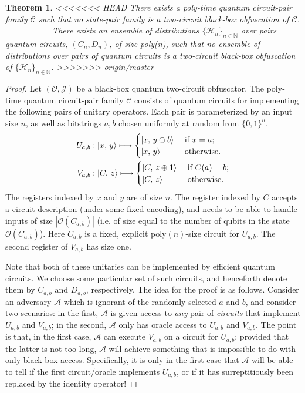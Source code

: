 \documentclass[11pt]{article}
\numberwithin{equation}{section}
\newtheorem{theorem}{Theorem}
\newcommand{\algo}{\mathcal}
\begin{document}
{\begin{theorem}
<<<<<<< HEAD
There exists a poly-time quantum circuit-pair family $\mathcal C$ such that no state-pair family is a two-circuit black-box obfuscation of $\mathcal C$.
=======
There exists an ensemble of distributions $\lbrace\mathcal{H}_n\rbrace_{n\in\mathbb{N}}$ over pairs quantum circuits, $(C_n, D_n)$, of size poly(n), such that no ensemble of distributions over pairs of quantum circuits is a two-circuit black-box obfuscation of $\lbrace\mathcal{H}_n\rbrace_{n\in\mathbb{N}}$.
>>>>>>> origin/master
\end{theorem}
\begin{proof}
Let $(\mathcal O, \mathcal J)$ be a black-box quantum two-circuit obfuscator. 
The poly-time quantum circuit-pair family $\mathcal C$ consists of quantum circuits for implementing the following pairs of unitary operators. Each pair is parameterized by an input size $n$, as well as bitstrings $a, b$ chosen uniformly at random from $\{0, 1\}^n$.
\begin{align}\label{eq:pair-impossible}
U_{a, b} &: {\left\vert{x,\, y}\right\rangle} \longmapsto
\begin{cases}
{\left\vert{x,\, y \oplus b}\right\rangle} &\text{ if } x = a;\\
{\left\vert{x,\, y}\right\rangle} &\text{ otherwise}.
\end{cases}\\
V_{a, b} &: {\left\vert{C,\, z}\right\rangle} \longmapsto
\begin{cases}
{\left\vert{C,\, z \oplus 1}\right\rangle} &\text{ if } C(a) = b;\\
{\left\vert{C,\, z}\right\rangle} &\text{ otherwise}.
\end{cases}
\end{align}
The registers indexed by $x$ and $y$ are of size $n$. The register indexed by $C$ accepts a circuit description (under some fixed encoding), and needs to be able to handle inputs of size $|\algo O(C_{a, b})|$ (i.e. of size equal to the number of qubits in the state $\algo O(C_{a, b})$). Here $C_{a, b}$ is a fixed, explicit poly$(n)$-size circuit for $U_{a, b}$. The second register of $V_{a, b}$ has size one. 

Note that both of these unitaries can be implemented by efficient quantum circuits. We choose some particular set of such circuits, and henceforth denote them by $C_{a,b}$ and $D_{a,b}$, respectively. The idea for the proof is as follows. Consider an adversary $\algo A$ which is ignorant of the randomly selected $a$ and $b$, and consider two scenarios: in the first, $\algo A$ is given access to \emph{any} pair of \emph{circuits} that implement $U_{a, b}$ and $V_{a, b}$; in the second, $\algo A$ only has oracle access to $U_{a, b}$ and $V_{a, b}$. The point is that, in the first case, $\algo A$ can execute $V_{a, b}$ on a circuit for $U_{a, b}$; provided that the latter is not too long, $\algo A$ will achieve something that is impossible to do with only black-box access. Specifically, it is only in the first case that $\algo A$ will be able to tell if the first circuit/oracle implements $U_{a, b}$, or if it has surreptitiously been replaced by the identity operator!


\end{proof}}
\end{document}
